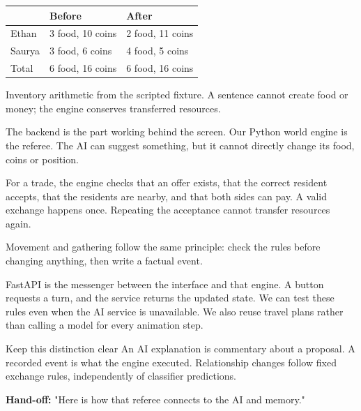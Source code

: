 \documentclass[11pt,a4paper]{article}
\newcommand{\pagehead}[3]{\clearpage{\color{forest}\small\ttfamily #1 \hfill #3}\par\vspace{3pt}{\LARGE\bfseries #2}\par\vspace{5pt}}
\newcommand{\subhead}[1]{\par\vspace{7pt}\noindent{\large\bfseries\color{forest}#1}\par\nobreak\vspace{2pt}}
\newcommand{\captiontext}[1]{{\footnotesize\color{muted}#1\par}}
\newcommand{\handoff}[1]{\vfill{\small\color{forest}\textbf{Hand-off:} #1}\par}
\begin{document}
\pagehead{BACKEND}{The world is the referee}{Rylee}
\label{backend}
\begin{center}
\end{center}
\subhead{A concrete exchange}
\begin{tabularx}{\linewidth}{@{}lYY@{}}
\toprule & \textbf{Before} & \textbf{After}\\\midrule
Ethan & 3 food, 10 coins & 2 food, 11 coins\\
Saurya & 3 food, 6 coins & 4 food, 5 coins\\
Total & 6 food, 16 coins & 6 food, 16 coins\\
\bottomrule
\end{tabularx}
\captiontext{Inventory arithmetic from the scripted fixture. A sentence cannot create food or money; the engine conserves transferred resources.}
\begin{saybox}
The backend is the part working behind the screen. Our Python world engine is the referee. The AI can suggest something, but it cannot directly change its food, coins or position.

For a trade, the engine checks that an offer exists, that the correct resident accepts, that the residents are nearby, and that both sides can pay. A valid exchange happens once. Repeating the acceptance cannot transfer resources again.

Movement and gathering follow the same principle: check the rules before changing anything, then write a factual event.

FastAPI is the messenger between the interface and that engine. A button requests a turn, and the service returns the updated state. We can test these rules even when the AI service is unavailable. We also reuse travel plans rather than calling a model for every animation step.
\end{saybox}
\begin{notebox}{Keep this distinction clear}
An AI explanation is commentary about a proposal. A recorded event is what the engine executed. Relationship changes follow fixed exchange rules, independently of classifier predictions.
\end{notebox}
\handoff{"Here is how that referee connects to the AI and memory."}
\end{document}
